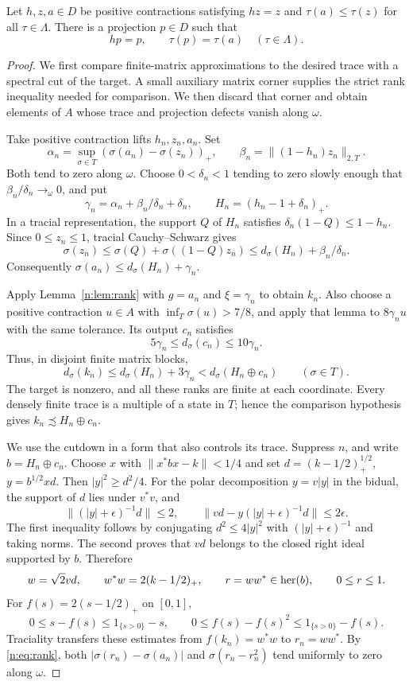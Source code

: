 \begin{proposition}\label{n:prop:selection}
Let $h,z,a\in D$ be positive contractions satisfying $hz=z$ and
$\tau(a)\le\tau(z)$ for all $\tau\in \Lambda$. There is a projection $p\in D$
such that
\[
 hp=p,\qquad \tau(p)=\tau(a)\quad(\tau\in \Lambda).
\]
\end{proposition}
\begin{proof}
We first compare finite-matrix approximations to the desired trace with
a spectral cut of the target. A small auxiliary matrix corner supplies
the strict rank inequality needed for comparison. We then discard that
corner and obtain elements of $A$ whose trace and projection defects
vanish along $\omega$.

Take positive contraction lifts $h_n,z_n,a_n$. Set
\[
 \alpha_n=\sup_{\sigma\in T}(\sigma(a_n)-\sigma(z_n))_+,
 \qquad \beta_n=\|(1-h_n)z_n\|_{2,T}.
\]
Both tend to zero along $\omega$. Choose $0<\delta_n<1$ tending to zero
slowly enough that $\beta_n/\delta_n\to_\omega0$, and put
\[
 \gamma_n=\alpha_n+\beta_n/\delta_n+\delta_n,
 \qquad H_n=(h_n-1+\delta_n)_+.
\]
In a tracial representation, the support $Q$ of $H_n$ satisfies
$\delta_n(1-Q)\le1-h_n$. Since $0\le z_n\le1$, tracial
Cauchy--Schwarz gives
\[
 \sigma(z_n)\le\sigma(Q)+\sigma((1-Q)z_n)
 \le d_\sigma(H_n)+\beta_n/\delta_n.
\]
Consequently $\sigma(a_n)\le d_\sigma(H_n)+\gamma_n$.

Apply Lemma~\ref{n:lem:rank} with $g=a_n$ and $\xi=\gamma_n$ to obtain
$k_n$. Also choose a positive contraction $u\in A$ with
$\inf_T\sigma(u)>7/8$, and apply that lemma to $8\gamma_nu$ with the
same tolerance. Its output $c_n$ satisfies
\[
 5\gamma_n\le d_\sigma(c_n)\le10\gamma_n.
\]
Thus, in disjoint finite matrix blocks,
\begin{equation}\label{n:eq:buffer}
 d_\sigma(k_n)\le d_\sigma(H_n)+3\gamma_n
       <d_\sigma(H_n\oplus c_n)\qquad(\sigma\in T).
\end{equation}
The target is nonzero, and all these ranks are finite at each coordinate.
Every densely finite trace is a multiple of a state in $T$; hence the
comparison hypothesis gives $k_n\precsim H_n\oplus c_n$.

We use the cutdown in a form that also controls its trace. Suppress $n$,
and write $b=H_n\oplus c_n$. Choose $x$ with $\|x^*bx-k\|<1/4$ and set
$d=(k-1/2)_+^{1/2}$, $y=b^{1/2}xd$. Then $|y|^2\ge d^2/4$.
For the polar decomposition $y=v|y|$ in the bidual, the support of $d$
lies under $v^*v$, and
\[
 \|(|y|+\epsilon)^{-1}d\|\le2,
 \qquad
 \|vd-y(|y|+\epsilon)^{-1}d\|\le2\epsilon.
\]
The first inequality follows by conjugating $d^2\le4|y|^2$ with
$(|y|+\epsilon)^{-1}$ and taking norms. The second proves that $vd$
belongs to the closed right ideal supported by $b$. Therefore
\[
 w=\sqrt2vd,\qquad w^*w=2(k-1/2)_+,
 \qquad r=ww^*\in\operatorname{her}(b),\qquad 0\le r\le1.
\]
For $f(s)=2(s-1/2)_+$ on $[0,1]$,
\[
 0\le s-f(s)\le1_{\{s>0\}}-s,
 \qquad 0\le f(s)-f(s)^2\le1_{\{s>0\}}-f(s).
\]
Traciality transfers these estimates from $f(k_n)=w^*w$ to $r_n=ww^*$.
By \eqref{n:eq:rank}, both $|\sigma(r_n)-\sigma(a_n)|$ and
$\sigma(r_n-r_n^2)$ tend uniformly to zero along $\omega$.


\end{proof}
